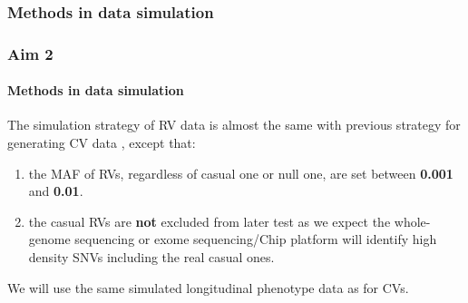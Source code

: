 \documentclass[compress]{beamer}
\begin{document}
\subsubsection{Methods in data simulation}
\begin{frame}[allowframebreaks]
\frametitle{Aim 2}
\framesubtitle{Methods in data simulation}
\scriptsize
The simulation strategy of RV data is almost the same with previous strategy for generating CV data , except that:
\begin{enumerate}
\item the MAF of RVs, regardless of casual one or null one, are set between \textbf{0.001} and \textbf{0.01}.
\item the casual RVs are \textbf{not} excluded from later test as we expect the whole-genome sequencing or exome sequencing/Chip platform will identify high density SNVs including the real casual ones.
\end{enumerate}
We will use the same simulated longitudinal phenotype data as for CVs.
\end{frame}



\end{document}
